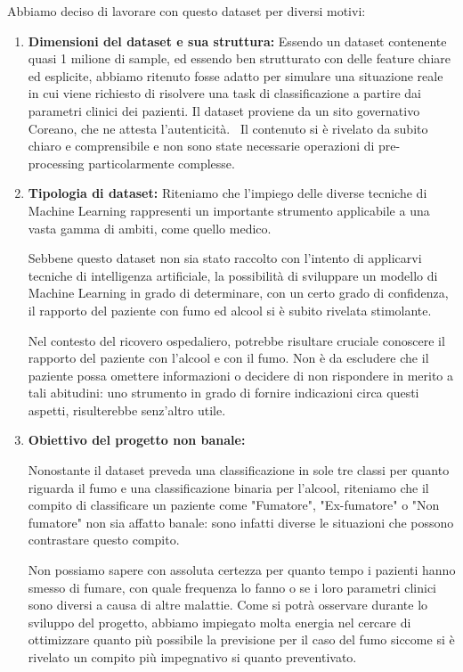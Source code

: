 \documentclass{article}
\begin{document}
\begin{multicols}{2}
Abbiamo deciso di lavorare con questo dataset per diversi motivi:
\begin{enumerate}[leftmargin=*]
    \item \textbf{Dimensioni del dataset e sua struttura:} 
    Essendo un dataset contenente quasi 1 milione di sample, ed essendo ben strutturato con delle feature chiare ed esplicite, abbiamo ritenuto fosse adatto per simulare una situazione reale in cui viene richiesto di risolvere una task di classificazione a partire dai parametri clinici dei pazienti. 
    Il dataset proviene da un sito governativo Coreano, che ne attesta l'autenticit\`a.~\cite{data_go_kr} 
    Il contenuto si \`e rivelato da subito chiaro e comprensibile e non sono state necessarie operazioni di pre-processing particolarmente complesse.
    
    \item \textbf{Tipologia di dataset:} 
    Riteniamo che l'impiego delle diverse tecniche di Machine Learning rappresenti un importante strumento applicabile a una vasta gamma di ambiti, come quello medico.
    
    Sebbene questo dataset non sia stato raccolto con l'intento di applicarvi tecniche di intelligenza artificiale, la possibilità di sviluppare un modello di Machine Learning in grado di determinare, con un certo grado di confidenza, il rapporto del paziente con fumo ed alcool si è subito rivelata stimolante.

    Nel contesto del ricovero ospedaliero, potrebbe risultare cruciale conoscere il rapporto del paziente con l'alcool e con il fumo.
    Non è da escludere che il paziente possa omettere informazioni o decidere di non rispondere in merito a tali abitudini: uno strumento in grado di fornire indicazioni circa questi aspetti, risulterebbe senz'altro utile.
    
    \item \textbf{Obiettivo del progetto non banale:} 
    
    Nonostante il dataset preveda una classificazione in sole tre classi per quanto riguarda il fumo e una classificazione binaria per l'alcool, riteniamo che il compito di classificare un paziente come "Fumatore", "Ex-fumatore" o "Non fumatore" non sia affatto banale: sono infatti diverse le situazioni che possono contrastare questo compito.

    Non possiamo sapere con assoluta certezza per quanto tempo i pazienti hanno smesso di fumare, con quale frequenza lo fanno o se i loro parametri clinici sono diversi a causa di altre malattie. Come si potr\`a osservare durante lo sviluppo del progetto, abbiamo impiegato molta energia nel cercare di ottimizzare quanto più possibile la previsione per il caso del fumo siccome si è rivelato un compito più impegnativo si quanto preventivato.



\end{enumerate}
\end{multicols}
\end{document}
